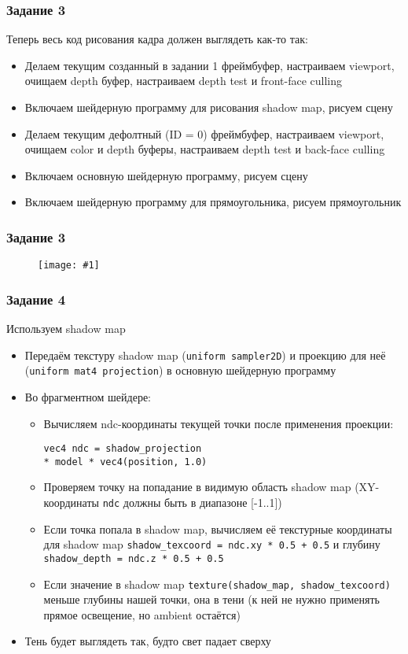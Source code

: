 \documentclass{beamer}
\newcommand{\slideimage}[1]{
  \begin{figure}
    \begin{adjustbox}{width=\textwidth, totalheight=\textheight-2\baselineskip-2\baselineskip,keepaspectratio}
      \texttt{[image: \#1]}
    \end{adjustbox}
  \end{figure}
}
\begin{document}
\begin{frame}[fragile]
\frametitle{Задание 3}
Теперь весь код рисования кадра должен выглядеть как-то так:
\begin{itemize}
\item Делаем текущим созданный в задании 1 фреймбуфер, настраиваем viewport, очищаем depth буфер, настраиваем depth test и front-face culling
\item Включаем шейдерную программу для рисования shadow map, рисуем сцену
\item Делаем текущим дефолтный (ID = 0) фреймбуфер, настраиваем viewport, очищаем color и depth буферы, настраиваем depth test и back-face culling
\item Включаем основную шейдерную программу, рисуем сцену
\item Включаем шейдерную программу для прямоугольника, рисуем прямоугольник
\end{itemize}
\end{frame}

\begin{frame}[fragile]
\frametitle{Задание 3}
\slideimage{3.png}
\end{frame}

\begin{frame}[fragile]
\frametitle{Задание 4}
\fontsize{10pt}{10pt}
Используем shadow map
\begin{itemize}
\item Передаём текстуру shadow map (\verb|uniform sampler2D|) и проекцию для неё (\verb|uniform mat4 projection|) в основную шейдерную программу
\item Во фрагментном шейдере:
\begin{itemize}
\item Вычисляем ndc-координаты текущей точки после применения проекции: \begin{verbatim}vec4 ndc = shadow_projection
* model * vec4(position, 1.0)\end{verbatim}
\item Проверяем точку на попадание в видимую область shadow map (XY-координаты \verb|ndc| должны быть в диапазоне [-1..1])
\item Если точка попала в shadow map, вычисляем её текстурные координаты для shadow map \verb|shadow_texcoord = ndc.xy * 0.5 + 0.5| и глубину \verb|shadow_depth = ndc.z * 0.5 + 0.5|
\item Если значение в shadow map \verb|texture(shadow_map, shadow_texcoord)| меньше глубины нашей точки, она в тени (к ней не нужно применять прямое освещение, но ambient остаётся)
\end{itemize}
\item Тень будет выглядеть так, будто свет падает сверху
\end{itemize}
\end{frame}
\end{document}
